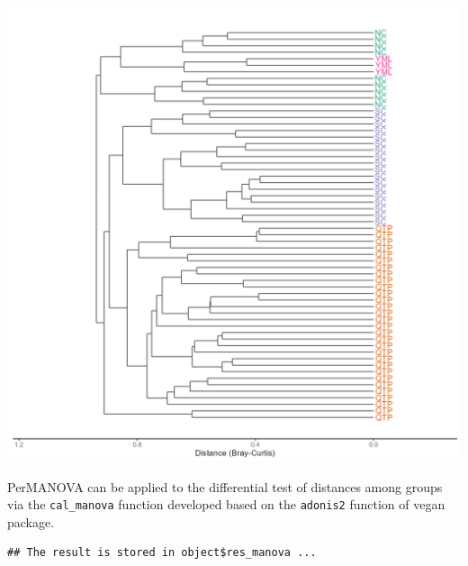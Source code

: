 \documentclass[
]{book}
\newenvironment{Shaded}{\begin{snugshade}}{\end{snugshade}}
\newcommand{\AttributeTok}[1]{\textcolor[rgb]{0.77,0.63,0.00}{#1}}
\newcommand{\CommentTok}[1]{\textcolor[rgb]{0.56,0.35,0.01}{\textit{#1}}}
\newcommand{\ConstantTok}[1]{\textcolor[rgb]{0.00,0.00,0.00}{#1}}
\newcommand{\FunctionTok}[1]{\textcolor[rgb]{0.00,0.00,0.00}{#1}}
\newcommand{\NormalTok}[1]{#1}
\newcommand{\SpecialCharTok}[1]{\textcolor[rgb]{0.00,0.00,0.00}{#1}}
\begin{document}
\begin{center}\includegraphics[width=550px]{Images/trans_beta_clustering} \end{center}

PerMANOVA\citep{Anderson_Austral_2001} can be applied to the differential test of distances among groups via the \texttt{cal\_manova} function developed
based on the \texttt{adonis2} function of vegan package.

\begin{Shaded}
\end{Shaded}

\begin{verbatim}
## The result is stored in object$res_manova ...
\end{verbatim}
\end{document}
